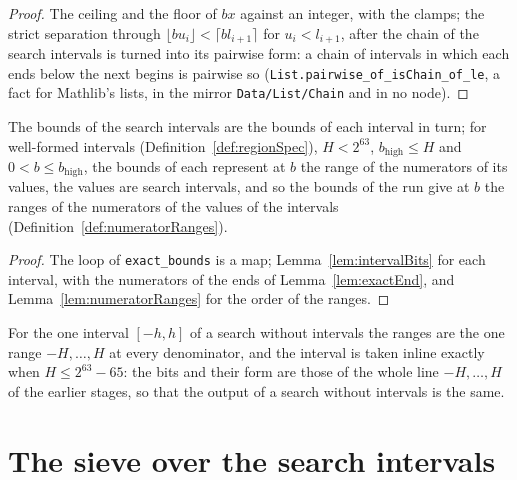 \begin{proof}\leanok
  The ceiling and the floor of $b x$ against an integer, with the clamps; the strict separation
  through $\lfloor b u_i \rfloor < \lceil b l_{i+1} \rceil$ for $u_i < l_{i+1}$, after the chain of
  the search intervals is turned into its pairwise form: a chain of intervals in which each ends
  below the next begins is pairwise so (\verb|List.pairwise_of_isChain_of_le|, a fact for Mathlib's
  lists, in the mirror \verb|Data/List/Chain| and in no node).
\end{proof}

\begin{lemma}\label{lem:exactBounds}
  \leanok
  The bounds of the search intervals are the bounds of each interval in turn; for well-formed
  intervals (Definition~\ref{def:regionSpec}), $H < 2^{63}$, $b_{\mathrm{high}} \le H$ and
  $0 < b \le b_{\mathrm{high}}$, the bounds of each represent at $b$ the range of the numerators of
  its values, the values are search intervals, and so the bounds of the run give at $b$ the ranges
  of the numerators of the values of the intervals (Definition~\ref{def:numeratorRanges}).
\end{lemma}

\begin{proof}\leanok
  The loop of \verb|exact_bounds| is a map; Lemma~\ref{lem:intervalBits} for each interval, with the
  numerators of the ends of Lemma~\ref{lem:exactEnd}, and Lemma~\ref{lem:numeratorRanges} for the
  order of the ranges.
\end{proof}

For the one interval $[-h, h]$ of a search without intervals the ranges are the one range
$-H, \dots, H$ at every denominator, and the interval is taken inline exactly when
$H \le 2^{63} - 65$: the bits and their form are those of the whole line $-H, \dots, H$ of the
earlier stages, so that the output of a search without intervals is the same.

\section{The sieve over the search intervals}\label{sec:regionSieve}

